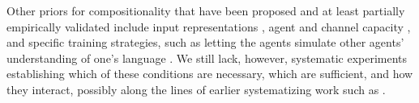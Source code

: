 Other priors for compositionality that have been proposed and at least partially
empirically validated include input representations
\cite{Lazaridou:etal:2018}, agent and channel capacity
\cite{Kottur:etal:2017,Mordatch:Abbeel:2018,Resnick:etal:2020}, and
specific training strategies, such as letting the agents simulate
other agents' understanding of one's language
\cite{Choi:etal:2018}. We still lack, however, systematic
experiments establishing which of these conditions are necessary,
which are sufficient, and how they interact, possibly along the lines
of earlier systematizing work such as .

